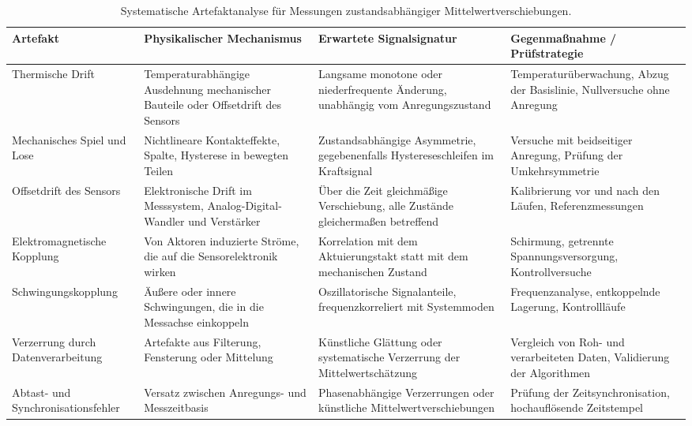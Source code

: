 \documentclass[12pt,a4paper]{report}
\begin{document}
\begin{table}[htbp]
\centering
\caption{Systematische Artefaktanalyse für Messungen
zustandsabhängiger Mittelwertverschiebungen.}
\small
\begin{tabular}{@{}>{\raggedright\arraybackslash}p{2.6cm} >{\raggedright\arraybackslash}p{3.8cm} >{\raggedright\arraybackslash}p{3.8cm} >{\raggedright\arraybackslash}p{4.5cm}@{}}
\toprule
Artefakt & Physikalischer Mechanismus & Erwartete Signalsignatur & Gegenmaßnahme / Prüfstrategie \\
\midrule

Thermische Drift
& Temperaturabhängige Ausdehnung mechanischer Bauteile oder Offsetdrift des Sensors
& Langsame monotone oder niederfrequente Änderung, unabhängig vom Anregungszustand
& Temperaturüberwachung, Abzug der Basislinie, Nullversuche ohne Anregung \\

Mechanisches Spiel und Lose
& Nichtlineare Kontakteffekte, Spalte, Hysterese in bewegten Teilen
& Zustandsabhängige Asymmetrie, gegebenenfalls Hystereseschleifen im Kraftsignal
& Versuche mit beidseitiger Anregung, Prüfung der Umkehrsymmetrie \\

Offsetdrift des Sensors
& Elektronische Drift im Messsystem, Analog-Digital-Wandler und Verstärker
& Über die Zeit gleichmäßige Verschiebung, alle Zustände gleichermaßen betreffend
& Kalibrierung vor und nach den Läufen, Referenzmessungen \\

Elektro\-magnetische Kopplung
& Von Aktoren induzierte Ströme, die auf die Sensorelektronik wirken
& Korrelation mit dem Aktuierungstakt statt mit dem mechanischen Zustand
& Schirmung, getrennte Spannungsversorgung, Kontrollversuche \\

Schwingungs\-kopplung
& Äußere oder innere Schwingungen, die in die Messachse einkoppeln
& Oszillatorische Signalanteile, frequenzkorreliert mit Systemmoden
& Frequenzanalyse, entkoppelnde Lagerung, Kontrollläufe \\

Verzerrung durch Datenverarbeitung
& Artefakte aus Filterung, Fensterung oder Mittelung
& Künstliche Glättung oder systematische Verzerrung der Mittelwertschätzung
& Vergleich von Roh- und verarbeiteten Daten, Validierung der Algorithmen \\

Abtast- und Synchronisationsfehler
& Versatz zwischen Anregungs- und Messzeitbasis
& Phasenabhängige Verzerrungen oder künstliche Mittelwertverschiebungen
& Prüfung der Zeitsynchronisation, hochauflösende Zeitstempel \\

\bottomrule
\end{tabular}
\end{table}
\end{document}
